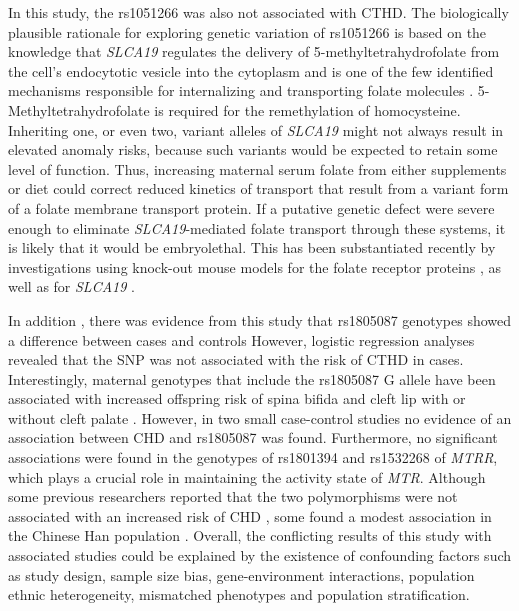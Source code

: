 \begin{refsection}
In this study, the rs1051266 was also not associated with CTHD. The biologically plausible rationale for exploring genetic variation of rs1051266 is based on the knowledge that \textit{SLCA19} regulates the delivery of 5-methyltetrahydrofolate from the cell’s endocytotic vesicle into the cytoplasm \cite{chango2000polymorphism,kamen1988delivery,brigle1995characterization,dixon1994novel,hresko1994topology} and is one of the few identified mechanisms responsible for internalizing and transporting folate molecules \cite{chango2000polymorphism}. 5-Methyltetrahydrofolate is required for the remethylation of homocysteine. Inheriting one, or even two, variant alleles of \textit{SLCA19} might not always result in elevated anomaly risks, because such variants would be expected to retain some level of function. Thus, increasing maternal serum folate from either supplements or diet could correct reduced kinetics of transport that result from a variant form of a folate membrane transport protein. If a putative genetic defect were severe enough to eliminate \textit{SLCA19}-mediated folate transport through these systems, it is likely that it would be embryolethal. This has been substantiated recently by investigations using knock-out mouse models for the folate receptor proteins \cite{piedrahita1999mice,finnell1998neural}, as well as for \textit{SLCA19} \cite{zhao2001rescue}.

In addition , there was evidence from this study that rs1805087 genotypes showed a difference between cases and controls However, logistic regression analyses revealed that the SNP was not associated with the risk of CTHD in cases. Interestingly, maternal genotypes that include the rs1805087 G allele have been associated with increased offspring risk of spina bifida and cleft lip with or without cleft palate \cite{mostowska2006maternal}. However, in two small case-control studies no evidence of an association between CHD and rs1805087 was found. Furthermore, no significant associations were found in the genotypes of rs1801394 and rs1532268 of \textit{MTRR}, which plays a crucial role in maintaining the activity state of \textit{MTR}. Although some previous researchers reported that the two polymorphisms were not associated with an increased risk of CHD \cite{cai2014genetic,van2006mtrr}, some found a modest association in the Chinese Han population \cite{zeng2011a66g}. Overall, the conflicting results of this study with associated studies could be explained by the existence of confounding factors such as study design, sample size bias, gene-environment interactions, population ethnic heterogeneity, mismatched phenotypes and population stratification. 


\end{refsection}
